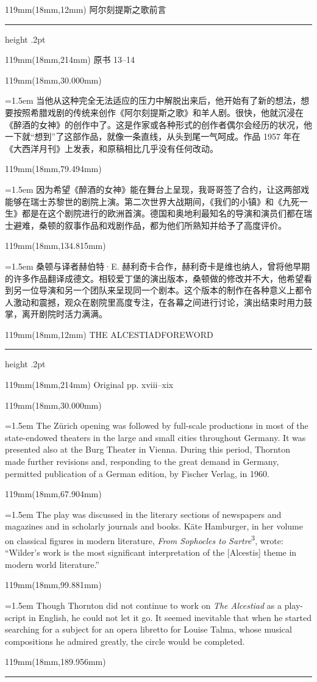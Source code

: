 \documentclass{article}
\newcommand{\ENsetup}{\normalfont\color{ink}\fontsize{11}{16.5}\selectfont\emergencystretch=1.5em}
\newcommand{\ZHsetup}{\normalfont\color{ink}\fontsize{10.5}{17}\selectfont\emergencystretch=1.5em}
\newcommand{\Block}[3]{\begin{textblock*}{119mm}(18mm,#1mm){#2 #3\par}\end{textblock*}}
\newcommand{\Heading}[3]{%
  \begin{textblock*}{119mm}(18mm,12mm)
    \color{quiet}\fontsize{7.5}{10}\selectfont
    #1\hfill #2\par\vspace{3mm}\hrule height .2pt
  \end{textblock*}
  \begin{textblock*}{119mm}(18mm,214mm)
    \color{quiet}\fontsize{7}{10}\selectfont #3\hfill\thepage
  \end{textblock*}
}
\begin{document}
\newpage
\null
\Heading{阿尔刻提斯之歌}{前言}{原书 13–14}
\Block{30.000}{\ZHsetup}{当他从这种完全无法适应的压力中解脱出来后，他开始有了新的想法，想要按照希腊戏剧的传统来创作《阿尔刻提斯之歌》和羊人剧。很快，他就沉浸在《醉酒的女神》的创作中了。这是作家或各种形式的创作者偶尔会经历的状况，他一下就“想到”了这部作品，就像一条直线，从头到尾一气呵成。作品 1957 年在《大西洋月刊》上发表，和原稿相比几乎没有任何改动。\par }
\Block{79.494}{\ZHsetup}{因为希望《醉酒的女神》能在舞台上呈现，我哥哥签了合约，让这两部戏能够在瑞士苏黎世的剧院上演。第二次世界大战期间，《我们的小镇》和《九死一生》都是在这个剧院进行的欧洲首演。德国和奥地利最知名的导演和演员们都在瑞士避难，桑顿的叙事作品和戏剧作品，都为他们所熟知并给予了高度评价。\par }
\Block{134.815}{\ZHsetup}{桑顿与译者赫伯特·E. 赫利奇卡合作，赫利奇卡是维也纳人，曾将他早期的许多作品翻译成德文。相较爱丁堡的演出版本，桑顿做的修改并不大，他希望看到另一位导演和另一个团队来呈现同一个剧本。这个版本的制作在各种意义上都令人激动和震撼，观众在剧院里高度专注，在各幕之间进行讨论，演出结束时用力鼓掌，离开剧院时活力满满。\par }
\newpage
\null
\Heading{THE ALCESTIAD}{FOREWORD}{Original pp. xviii–xix}
\Block{30.000}{\ENsetup}{The Zürich opening was followed by full-scale productions in most of the state-endowed theaters in the large and small cities throughout Germany. It was presented also at the Burg Theater in Vienna. During this period, Thornton made further revisions and, responding to the great demand in Germany, permitted publication of a German edition, by Fischer Verlag, in 1960.\par}
\Block{67.904}{\ENsetup}{The play was discussed in the literary sections of newspapers and magazines and in scholarly journals and books. Käte Hamburger, in her volume on classical figures in modern literature, \textit{From Sophocles to Sartre}\textsuperscript{3}, wrote: ``Wilder's work is the most significant interpretation of the [Alcestis] theme in modern world literature.''\par}
\Block{99.881}{\ENsetup}{Though Thornton did not continue to work on \textit{The Alcestiad} as a play-script in English, he could not let it go. It seemed inevitable that when he started searching for a subject for an opera libretto for Louise Talma, whose musical compositions he admired greatly, the circle would be completed.\par}
\begin{textblock*}{119mm}(18mm,189.956mm)\color{ink}\rule{30mm}{.25pt}\end{textblock*}
\end{document}
